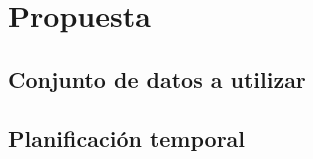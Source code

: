 \section{Propuesta}


\subsection{Conjunto de datos a utilizar}

\subsection{Planificación temporal}
